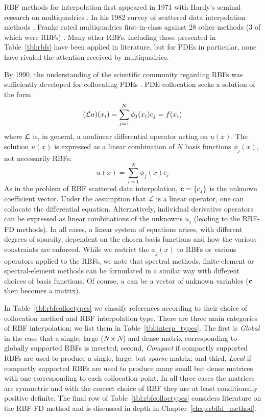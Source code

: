 \documentclass[11pt]{report}
\begin{document}
{







RBF methods for interpolation first appeared in 1971 with Hardy's seminal research on multiquadrics
\cite{Hardy1971}. In his 1982 survey of scattered data interpolation methods \cite{Franke1982}, Franke rated multiquadrics first-in-class against 28 other methods (3 of which were RBFs) \cite{Franke1982}. Many other RBFs, 
including those presented in Table~\ref{tbl:rbfs} have been applied in literature, but for PDEs in particular, none have rivaled the 
attention received by multiquadrics. 


By 1990, the understanding of the scientific community regarding RBFs was sufficiently developed for collocating PDEs \cite{Kansa1990a,Kansa1990b}. PDE collocation seeks a solution of the form
\begin{eqnarray*}
(\mathcal{L}u)(x_i) = \sum_{j=1}^{N} \phi_j(x_i) c_j = f(x_i)
\end{eqnarray*}
where $\mathcal{L}$ is, in general, a nonlinear differential operator acting on $u(x)$. The solution $u(x)$ is expressed as a linear combination of $N$ basis functions $\phi_j(x)$, not necessarily RBFs: 
$$
u(x) = \sum_{i=1}^N \phi_j(x) c_j 
$$
As in the problem of RBF scattered data interpolation, $ \mathbf{c} = \{c_j\} $ is the unknown coefficient vector. 
Under the assumption that $\mathcal{L}$ is a linear operator, one can collocate the differential equation. Alternatively, individual derivative operators can be expressed as linear combinations of the unknowns $u_j$ (leading to the RBF-FD methods). 
In all cases, a linear system of equations arises, with different degrees of sparsity, dependent on the chosen basis functions and how the various constraints are enforced.  While we restrict the $\phi_j(x)$ to RBFs or various operators applied to the RBFs, we note that spectral methods, finite-element or spectral-element methods can be formulated in a similar way with different choices of basis functions.  Of course, $u$ can be a vector of unknown variables ($\mathbf{c}$ then becomes a matrix). 

In Table~\ref{tbl:rbfcolloctypes} we classify references according to their choice of collocation method and RBF 
interpolation type. 
There are three main categories of RBF interpolation; we list them in Table~\ref{tbl:interp_types}. The first is \emph{Global} in the case that a single, large ($N\times N$) and 
dense matrix corresponding to globally supported RBFs is inverted; second, \emph{Compact} if compactly supported RBFs are used to 
produce a single, large, but \emph{sparse} matrix; and third, \emph{Local} if compactly supported RBFs are used to produce many small but 
dense matrices with one corresponding to each collocation point. In all three cases the matrices are symmetric and with the correct choice of RBF they are at least conditionally positive definite. The final row of Table~\ref{tbl:rbfcolloctypes} considers literature on the RBF-FD method and is discussed in depth in Chapter~\ref{chap:rbffd_method}.

}
\end{document}
